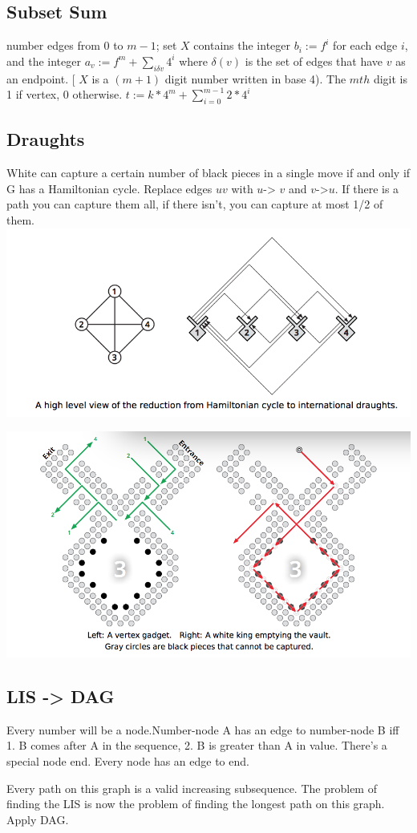 \subsection{Subset Sum}

number edges from 0 to $m-1$; set $X$ contains the integer $b_{i} := f^{i}$ for each edge $i$, and the integer $a_{v} := f^{m} + \sum_{i \delta v}{4^i}$ where $\delta(v)$ is the set of edges that have $v$ as an endpoint. [ $X$ is a $(m+1)$ digit number written in base 4). The $mth$ digit is 1 if vertex, 0 otherwise. $t:= k * 4^m + \sum_{i = 0}^{m-1}{2 * 4^i}$

\subsection{Draughts}

White can capture a certain number of black pieces in a single move if and only if G has a Hamiltonian cycle. Replace edges $uv$ with  $u$-> $v$ and $v$->$u$. If there is a path you can capture them all, if there isn't, you can capture at most 1/2 of them.
\includegraphics[width=\linewidth]{images/draughtssmall.png}

\includegraphics[width=\linewidth]{images/draughts.png}

\subsection{LIS -> DAG}

Every number will be a node.Number-node A has an edge to number-node B iff 1. B comes after A in the sequence, 2. B is greater than A in value. There's a special node end. Every node has an edge to end.

Every path on this graph is a valid increasing subsequence. The problem of finding the LIS is now the problem of finding the longest path on this graph. Apply DAG.

